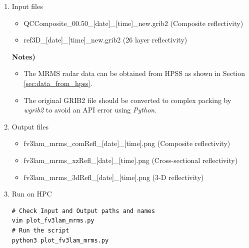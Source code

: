 \documentclass[11pt,fleqn]{report}              %
\begin{document}
\begin{enumerate}
\item Input files
\begin{itemize}
\item QCComposite\_00.50\_[date]\_[time]\_new.grib2 (Composite reflectivity)
\item ref3D\_[date]\_[time]\_new.grib2 (26 layer reflectivity)
\end{itemize}

{\bf Notes)} 
\begin{itemize}
\item The MRMS radar data can be obtained from HPSS as shown in Section \ref{sec:data_from_hpss}.
\item The original GRIB2 file should be converted to complex packing by {\it wgrib2} to avoid an API error using {\it Python}.
\end{itemize}

\item Output files
\begin{itemize}
\item fv3lam\_mrms\_comRefl\_[date]\_[time].png (Composite reflectivity)
\item fv3lam\_mrms\_xzRefl\_[date]\_[time].png (Cross-sectional reflectivity)
\item fv3lam\_mrms\_3dRefl\_[date]\_[time].png (3-D reflectivity)
\end{itemize}
\item Run on HPC

\lstset{language=bash}   
\begin{lstlisting}[frame=trBL]
# Check Input and Output paths and names
vim plot_fv3lam_mrms.py
# Run the script
python3 plot_fv3lam_mrms.py
\end{lstlisting}



\end{enumerate}
\end{document}
